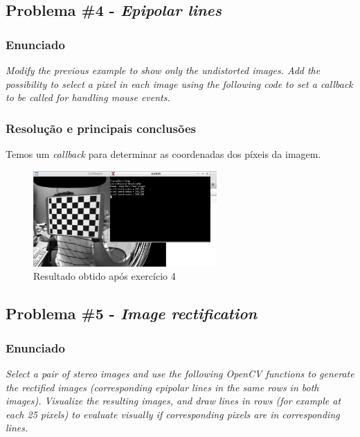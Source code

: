\documentclass[portuguese, times, mirror]{revdetua}
\begin{document}


\subsection{Problema \#4 - \textit{Epipolar lines}}

\subsubsection{Enunciado}
\textit{Modify the previous example to show only the undistorted images. Add the possibility to select a
pixel in each image using the following code to set a callback to be called for handling mouse events.}

\subsubsection{Resolução e principais conclusões}

Temos um \textit{callback} para determinar as coordenadas dos píxeis da imagem. 

\begin{figure}[ht!]
\centering
\includegraphics[width=70mm]{img/ex4.png}
\caption{Resultado obtido após exercício 4}
\end{figure}


\subsection{Problema \#5 - \textit{Image rectification}}

\subsubsection{Enunciado}
\textit{Select a pair of stereo images and use the following OpenCV functions to generate the rectified images (corresponding epipolar lines in the same rows in both images). Visualize the resulting images, and draw lines in rows (for example at each 25 pixels) to evaluate
visually if corresponding pixels are in corresponding lines.}
\end{document}
